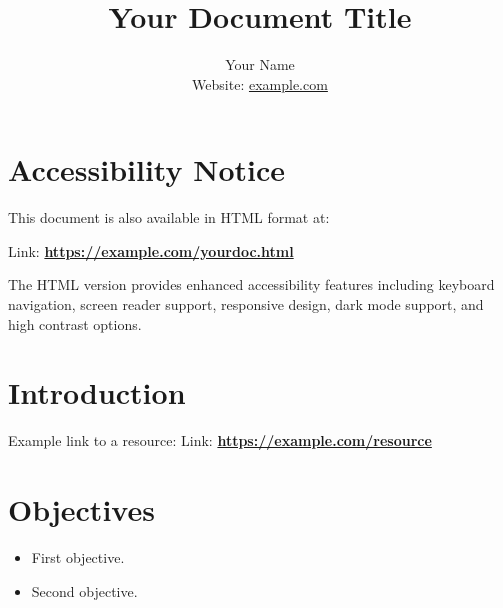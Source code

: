 \documentclass[12pt]{article}
\title{Your Document Title}
\author{
    Your Name \\
    Website: \href{https://example.com}{example.com} \\
    \date{\vspace{-5ex}}
}
\begin{document}
\maketitle


%
\section*{Accessibility Notice}
This document is also available in HTML format at:

Link: \href{https://example.com/yourdoc.html}{\textbf{https://example.com/yourdoc.html}}

The HTML version provides enhanced accessibility features including keyboard
navigation, screen reader support, responsive design, dark mode support, and
high contrast options.


%
\section*{Introduction}

Example link to a resource:
Link: \href{https://example.com/resource}{\textbf{https://example.com/resource}}


\section*{Objectives}
\begin{itemize}
    \item First objective.
    \item Second objective.
\end{itemize}
\end{document}
